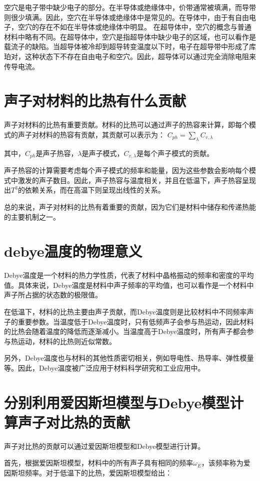 \documentclass[12pt, a4paper, oneside]{ctexart}
\begin{document}
\begin{spacing}{2.0}
空穴是电子带中缺少电子的部分。在半导体或绝缘体中，价带通常被填满，而导带则很少填满。因此，空穴在半导体或绝缘体中是常见的。在导体中，由于有自由电子，空穴的存在不如在半导体或绝缘体中明显。
在超导体中，空穴的概念与普通材料中略有不同。在超导体中，空穴是指超导体中缺少电子的区域，也可以看作是载流子的缺陷。当超导体被冷却到超导转变温度以下时，电子在超导带中形成了库珀对，这种状态下不存在自由电子和空穴。因此，超导体可以通过完全消除电阻来传导电流。

\section{声子对材料的比热有什么贡献}
声子对材料的比热有重要贡献。材料的比热可以通过声子的热容来计算，即每个模式的声子对材料的热容有贡献，其贡献可以表示为：
$C_{ph} = \sum_{\lambda} C_{v, \lambda}$

其中，$C_{ph}$是声子热容，$\lambda$是声子模式，$C_{v, \lambda}$是每个声子模式的贡献。

声子热容的计算需要考虑每个声子模式的频率和能量，因为这些参数会影响每个模式中激发的声子数目。因此，声子热容与温度相关，并且在低温下，声子热容呈现出$T^3$的依赖关系，而在高温下则呈现出线性的关系。

总的来说，声子对材料的比热有着重要的贡献，因为它们是材料中储存和传递热能的主要机制之一。
\section{debye温度的物理意义}
Debye温度是一个材料的热力学性质，代表了材料中晶格振动的频率和密度的平均值。具体来说，Debye温度是材料中声子频率的平均值，也可以看作是一个材料中声子所占据的状态数的极限值。

在低温下，材料的比热主要由声子贡献，而Debye温度则是比较材料中不同频率声子的重要参数。当温度低于Debye温度时，只有低频声子会参与热运动，因此材料的比热会随着温度的降低而逐渐减小。当温度高于Debye温度时，所有声子都会参与热运动，材料的比热则近似常数。

另外，Debye温度也与材料的其他性质密切相关，例如导电性、热导率、弹性模量等。因此，Debye温度被广泛应用于材料科学研究和工业应用中。




\section{分别利用爱因斯坦模型与Debye模型计算声子对比热的贡献}

声子对比热的贡献可以通过爱因斯坦模型和Debye模型进行计算。

首先，根据爱因斯坦模型，材料中的所有声子具有相同的频率$\omega_E$，该频率称为爱因斯坦频率。对于低温下的比热，爱因斯坦模型给出：


\end{spacing}
\end{document}
